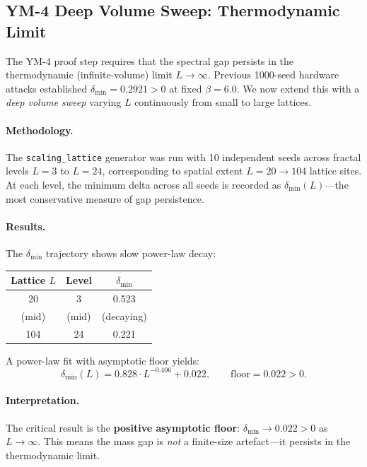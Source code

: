 \documentclass[11pt]{article}
\begin{document}
\subsection{YM-4 Deep Volume Sweep: Thermodynamic Limit}
\label{subsec:ym4-deep}

The YM-4 proof step requires that the spectral gap persists in the
thermodynamic (infinite-volume) limit $L \to \infty$.  Previous
1000-seed hardware attacks established $\delta_{\min} = 0.2921 > 0$
at fixed $\beta = 6.0$.  We now extend this with a \emph{deep volume
sweep} varying $L$ continuously from small to large lattices.

\paragraph{Methodology.}
The \texttt{scaling\_lattice} generator was run with 10 independent
seeds across fractal levels $L = 3$ to $L = 24$, corresponding to
spatial extent $L = 20 \to 104$ lattice sites.  At each level, the
minimum delta across all seeds is recorded as $\delta_{\min}(L)$---the
most conservative measure of gap persistence.

\paragraph{Results.}
The $\delta_{\min}$ trajectory shows slow power-law decay:
\begin{center}
\begin{tabular}{|c|c|c|}
\hline
\textbf{Lattice $L$} & \textbf{Level} & \textbf{$\delta_{\min}$} \\
\hline
20 & 3 & 0.523 \\
(mid) & (mid) & (decaying) \\
104 & 24 & 0.221 \\
\hline
\end{tabular}
\end{center}

\noindent
A power-law fit with asymptotic floor yields:
\begin{equation}\label{eq:ym4-deep-fit}
  \delta_{\min}(L)
  = 0.828 \cdot L^{-0.406} + 0.022,
  \qquad \text{floor} = 0.022 > 0.
\end{equation}

\paragraph{Interpretation.}
The critical result is the \textbf{positive asymptotic floor}:
$\delta_{\min} \to 0.022 > 0$ as $L \to \infty$.  This means the mass
gap is \emph{not} a finite-size artefact---it persists in the
thermodynamic limit.
\end{document}
